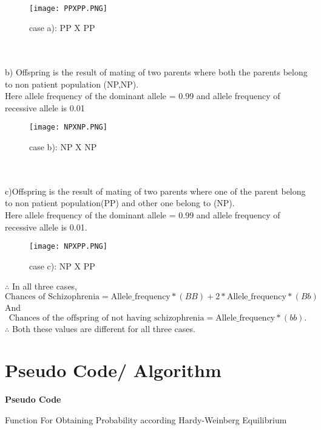 \documentclass{article}
\begin{document}
\\
\begin{figure}
    \centering
    \texttt{[image: PPXPP.PNG]}
    
    \caption{case a): PP X PP}
\end{figure}
\\
\\
b) Offspring is the result of mating of two parents where both the parents belong to non patient population (NP,NP). \\Here allele frequency of the dominant allele = 0.99 and allele frequency of recessive allele is 0.01
\\
\begin{figure}
    \centering
    \texttt{[image: NPXNP.PNG]}
    
    \caption{case b): NP X NP}
\end{figure}
\\
\\
c)Offspring is the result of mating of two parents where one of the parent belong to non patient population(PP) and other one belong to (NP). \\Here allele frequency of the dominant allele = 0.99 and allele frequency of recessive allele is 0.01.
\\
\begin{figure}
    \centering
    \texttt{[image: NPXPP.PNG]}
    \caption{case c): NP X PP}
\end{figure}

$\therefore$ In all three cases,
\begin{equation*}
    \text{Chances of Schizophrenia} = \text{Allele\_frequency}*(BB) + 2*\text{Allele\_frequency}*(Bb)
\end{equation*}
And
\begin{equation*}
    \text{Chances of the offspring of not having schizophrenia} = \text{Allele\_frequency}*(bb).
\end{equation*}
$\therefore$ Both these values are different for all three cases.
\newpage

\large
\section{Pseudo Code/ Algorithm}
\textbf{Pseudo Code}

\begin{algorithm}
\caption{Function For Obtaining Probability according Hardy-Weinberg Equilibrium }
\begin{algorithmic}[1]
    \State {}          
\EndFunction
\end{algorithmic}
\end{algorithm}
\end{document}
